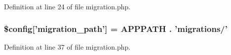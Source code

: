 Definition at line 24 of file migration.\-php.

\hypertarget{application_2config_2migration_8php_abc04383313304e348060a7ee39f5a8ee}{
\subsubsection[{\$config}]{\setlength{\rightskip}{0pt plus 5cm}\$config\mbox{[}'migration\-\_\-path'\mbox{]} = A\-P\-P\-P\-A\-T\-H . 'migrations/'}}\label{application_2config_2migration_8php_abc04383313304e348060a7ee39f5a8ee}


Definition at line 37 of file migration.\-php.


